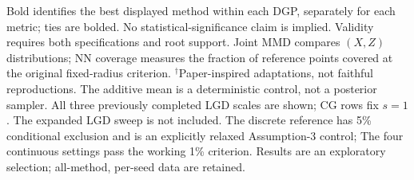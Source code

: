 \begin{table}[t]
\begin{minipage}{\textwidth}\footnotesize
Bold identifies the best displayed method within each DGP, separately for each metric; ties are bolded. No statistical-significance claim is implied.
Validity requires both specifications and root support. Joint MMD compares $(X,Z)$ distributions; NN coverage measures the fraction of reference points covered at the original fixed-radius criterion.
$^{\dagger}$Paper-inspired adaptations, not faithful reproductions. The additive mean is a deterministic control, not a posterior sampler. All three previously completed LGD scales are shown; CG rows fix $s=1$. The expanded LGD sweep is not included.
The discrete reference has 5\% conditional exclusion and is an explicitly relaxed Assumption-3 control; The four continuous settings pass the working 1\% criterion. Results are an exploratory selection; all-method, per-seed data are retained.
\end{minipage}
\end{table}
